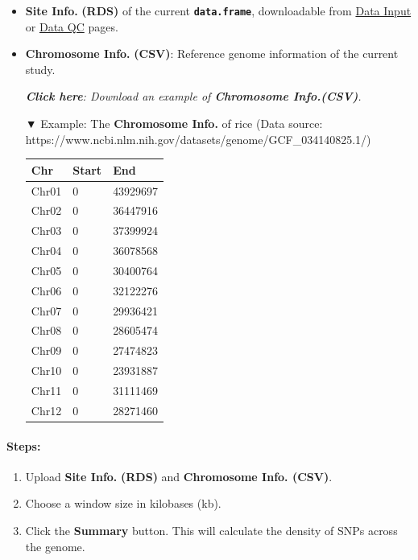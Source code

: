 \documentclass[
]{book}
\begin{document}
\begin{itemize}
\item
  \textbf{Site Info.} \textbf{(RDS)} of the current \textbf{\texttt{data.frame}}, downloadable from \ul{Data Input} or \ul{Data QC} pages.
\item
  \textbf{Chromosome Info.} \textbf{(CSV)}: Reference genome information of the current study.

  \textbf{\emph{Click here}}\emph{: Download an example of \textbf{Chromosome Info.(CSV)}.}

  ▼ Example: The \textbf{Chromosome Info.} of rice (Data source: https://www.ncbi.nlm.nih.gov/datasets/genome/GCF\_034140825.1/)

  \begin{longtable}[]{@{}lll@{}}
  \toprule\noalign{}
  Chr & Start & End \\
  \midrule\noalign{}
  \endhead
  \bottomrule\noalign{}
  \endlastfoot
  Chr01 & 0 & 43929697 \\
  Chr02 & 0 & 36447916 \\
  Chr03 & 0 & 37399924 \\
  Chr04 & 0 & 36078568 \\
  Chr05 & 0 & 30400764 \\
  Chr06 & 0 & 32122276 \\
  Chr07 & 0 & 29936421 \\
  Chr08 & 0 & 28605474 \\
  Chr09 & 0 & 27474823 \\
  Chr10 & 0 & 23931887 \\
  Chr11 & 0 & 31111469 \\
  Chr12 & 0 & 28271460 \\
  \end{longtable}
\end{itemize}

\paragraph*{Steps:}\label{steps}

\begin{enumerate}
\def\labelenumi{\arabic{enumi}.}
\item
  {Upload} \textbf{Site Info.} \textbf{(RDS)} and \textbf{Chromosome Info. (CSV)}.
\item
  Choose a window size in kilobases (kb).
\item
  Click the {\textbf{Summary}} button. This will calculate the density of SNPs across the genome.
\end{enumerate}
\end{document}
